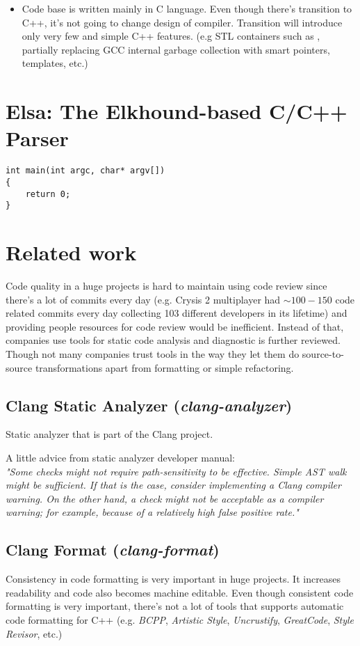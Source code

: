 \begin{itemize}
\item Code base is written mainly in C language. Even though there's transition to C++, it's not going to change design of compiler. Transition will introduce only very few and simple C++ features. (e.g STL containers such as , partially replacing GCC internal garbage collection with smart pointers, templates, etc.)
\end{itemize}

\section{Elsa: The Elkhound-based C/C++ Parser}

\begin{lstlisting}
int main(int argc, char* argv[])
{
    return 0;
}
\end{lstlisting}

\section{Related work}
Code quality in a huge projects is hard to maintain using code review since there's a lot of commits every day (e.g. Crysis 2 multiplayer had $\sim100-150$ code related commits every day collecting 103 different developers in its lifetime) and providing people resources for code review would be inefficient. Instead of that, companies use tools for static code analysis and diagnostic is further reviewed. Though not many companies trust tools in the way they let them do source-to-source transformations apart from formatting or simple refactoring.

\subsection{Clang Static Analyzer (\emph{clang-analyzer})}
Static analyzer that is part of the Clang project.

A little advice from static analyzer developer manual:\\

\label{clang-analyzer-checkers}
\emph{"Some checks might not require path-sensitivity to be effective. Simple AST walk might be sufficient. If that is the case, consider implementing a Clang compiler warning. On the other hand, a check might not be acceptable as a compiler warning; for example, because of a relatively high false positive rate."}

\subsection{Clang Format (\emph{clang-format})}
Consistency in code formatting is very important in huge projects. It increases readability and code also becomes machine editable. Even though consistent code formatting is very important, there's not a lot of tools that supports automatic code formatting for C++ (e.g. \textit{BCPP}, \textit{Artistic Style}, \textit{Uncrustify}, \textit{GreatCode}, \emph{Style Revisor}, etc.)

